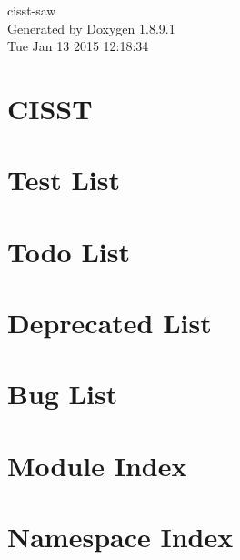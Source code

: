 \documentclass[twoside]{book}
\newcommand{\+}{\discretionary{\mbox{\scriptsize$\hookleftarrow$}}{}{}}
\newcommand{\clearemptydoublepage}{%
  \newpage{\pagestyle{empty}\cleardoublepage}%
}
\begin{document}
\hypersetup{pageanchor=false,
             bookmarks=true,
             bookmarksnumbered=true,
             pdfencoding=unicode
            }
\begin{titlepage}
\vspace*{7cm}
\begin{center}%
{\Large cisst-\/saw }\\
\vspace*{1cm}
{\large Generated by Doxygen 1.8.9.1}\\
\vspace*{0.5cm}
{\small Tue Jan 13 2015 12:18:34}\\
\end{center}
\end{titlepage}
\clearemptydoublepage
\tableofcontents
\clearemptydoublepage
{}
\hypersetup{pageanchor=true}

\chapter{C\+I\+S\+S\+T}
\label{index}\hypertarget{index}{}
\chapter{Test List}
\label{d4/df6/test}
\hypertarget{d4/df6/test}{}

\chapter{Todo List}
\label{dd/da0/todo}
\hypertarget{dd/da0/todo}{}

\chapter{Deprecated List}
\label{da/d58/deprecated}
\hypertarget{da/d58/deprecated}{}

\chapter{Bug List}
\label{de/da5/bug}
\hypertarget{de/da5/bug}{}

\chapter{Module Index}

\chapter{Namespace Index}

\end{document}
